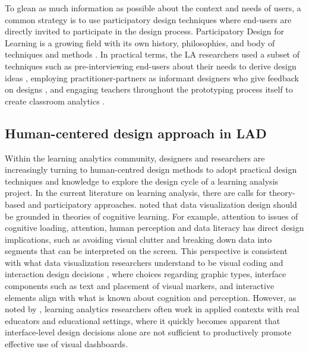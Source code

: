 \documentclass[preprint,12pt]{elsarticle}
\begin{document}
To glean as much information as possible about the context and needs of users, 
a common strategy is to use participatory design techniques where end-users are directly invited to participate in the design process. 
Participatory Design for Learning is a growing field with its own history, philosophies, and body of techniques and methods \cite{disalvo2017participatory}. In practical terms, the LA researchers used a subset of techniques such as pre-interviewing end-users about 
their needs to derive design ideas \cite{xhakaj2016teachers}, employing practitioner-partners as informant designers who give feedback on 
designs \cite{fiorini2018application}, and engaging teachers throughout the prototyping process itself to create classroom analytics \cite{holstein2018classroom}.


\subsection{Human-centered design approach in LAD}
Within the learning analytics community, designers and researchers are increasingly turning to human-centred design methods to adopt practical design techniques and knowledge to explore the design cycle of a learning analysis project. In the current literature on learning analysis, there are calls for theory-based and participatory approaches. \citet{alhadad2018visualizing}  noted that data visualization design should be grounded in theories of cognitive learning. For example, attention to issues of cognitive loading, attention, human perception and data literacy has direct design implications, such as avoiding visual clutter and breaking down data into segments that can be interpreted on the screen. This perspective is consistent with what data visualization researchers understand to be visual coding and interaction design decisions \citep{munzner2014visualization}, where choices regarding graphic types, interface components such as text and placement of visual markers, and interactive elements align with what is known about cognition and perception.
However, as noted by \citet{dollinger2018co}, learning analytics researchers often work in applied contexts with real educators and educational settings, where it quickly becomes apparent that interface-level design decisions alone are not sufficient to productively promote effective use of visual dashboards. 
\end{document}
